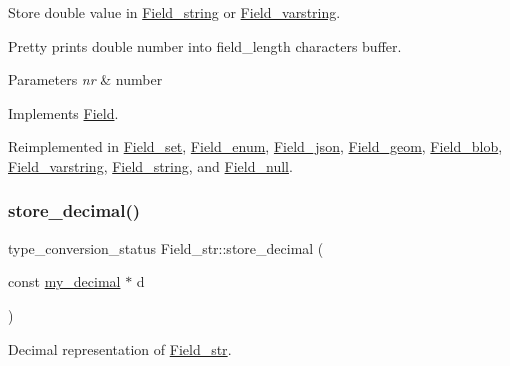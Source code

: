 Store double value in \mbox{\hyperlink{classField__string}{Field\+\_\+string}} or \mbox{\hyperlink{classField__varstring}{Field\+\_\+varstring}}.

Pretty prints double number into field\+\_\+length characters buffer.


\begin{DoxyParams}{Parameters}
{\em nr} & number \\
\hline
\end{DoxyParams}


Implements \mbox{\hyperlink{classField}{Field}}.



Reimplemented in \mbox{\hyperlink{classField__set_a58b1852786b3bfe85a3cd2dd7edbfaf2}{Field\+\_\+set}}, \mbox{\hyperlink{classField__enum_a82c1cdf5b47cd0266d9974e834695523}{Field\+\_\+enum}}, \mbox{\hyperlink{classField__json_a2242a237a4e212ba5eadba6f5053df3c}{Field\+\_\+json}}, \mbox{\hyperlink{classField__geom_aa150c79e0569c74ed2a004ddab0dc6f1}{Field\+\_\+geom}}, \mbox{\hyperlink{classField__blob_a2bc7bea5075f5ebbee1a11c13e37b5b2}{Field\+\_\+blob}}, \mbox{\hyperlink{classField__varstring_ad54d8ec0e88d58ffde65168643155434}{Field\+\_\+varstring}}, \mbox{\hyperlink{classField__string_a154a1bcd6578f53da8bccb43cc57cb60}{Field\+\_\+string}}, and \mbox{\hyperlink{classField__null_a396499b751f2dd051b816a3953943d2b}{Field\+\_\+null}}.

\mbox{\label{classField__str_ae0a260a3e657aa6778dcf651ff3e9b95}} 
\subsubsection{\texorpdfstring{store\+\_\+decimal()}{store\_decimal()}}
{\footnotesize\ttfamily type\+\_\+conversion\+\_\+status Field\+\_\+str\+::store\+\_\+decimal (\begin{DoxyParamCaption}\item[{const \mbox{\hyperlink{classmy__decimal}{my\+\_\+decimal}} $\ast$}]{d }\end{DoxyParamCaption})\hspace{0.3cm}{\ttfamily [virtual]}}

Decimal representation of \mbox{\hyperlink{classField__str}{Field\+\_\+str}}.


